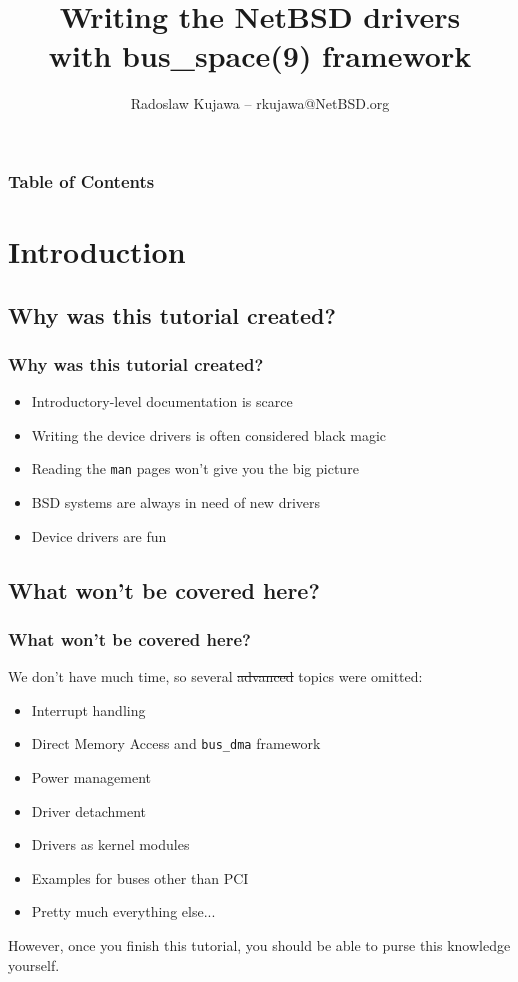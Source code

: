 \documentclass[dvipsnames,table]{beamer}
\title{Writing the NetBSD drivers\\with bus\_space(9) framework}
\author{Radoslaw Kujawa -- rkujawa@NetBSD.org}
\institute{The NetBSD Foundation}
\begin{document}
\begin{frame}
\titlepage
\end{frame}

\begin{frame}[allowframebreaks]
\frametitle{Table of Contents}
{
\hypersetup{colorlinks=true,linkcolor=black,urlcolor=NetBSD-orange}
\tableofcontents
}
\end{frame}

\section{Introduction}
\subsection{Why was this tutorial created?}

\begin{frame}
\frametitle{Why was this tutorial created?}

\begin{itemize}
	\item Introductory-level documentation is scarce
	\item Writing the device drivers is often considered black magic
	\item Reading the {\tt man} pages won't give you the big picture
	\item BSD systems are always in need of new drivers
	\item Device drivers are fun {\Large \smiley}
\end{itemize}
\end{frame}

\subsection{What won't be covered here?}

\begin{frame}
\frametitle{What won't be covered here?}

We don't have much time, so several \sout{advanced} topics were omitted:

\begin{itemize}
	\item Interrupt handling
	\item Direct Memory Access and {\tt bus\_dma} framework
	\item Power management
	\item Driver detachment
	\item Drivers as kernel modules
	\item Examples for buses other than PCI
	\item Pretty much everything else...
\end{itemize}

However, once you finish this tutorial, you should be able to purse this knowledge yourself.

\end{frame}
\end{document}
